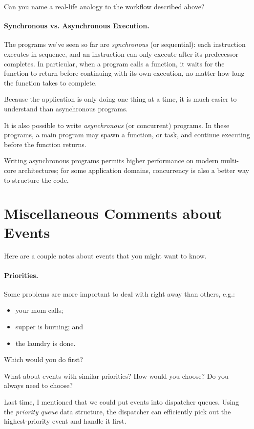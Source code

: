 {\sf Can you name a real-life analogy to the workflow described above?}
\\[1em]

\paragraph{Synchronous vs. Asynchronous Execution.} The programs we've
seen so far are \emph{synchronous} (or sequential): each instruction
executes in sequence, and an instruction can only execute after its
predecessor completes.
In particular, when a program calls a function, it waits for the function
to return before continuing with its own execution, no matter how long
the function takes to complete.

Because the application is only doing one thing at a time, it is much
easier to understand than asynchronous programs.

It is also possible to write \emph{asynchronous} (or concurrent)
programs. In these programs, a main program may spawn a function, or
task, and continue executing before the function returns.

Writing asynchronous programs permits higher performance on modern
multi-core architectures; for some application domains, concurrency is
also a better way to structure the code.

\section*{Miscellaneous Comments about Events}
Here are a couple notes about events that you might want to know.

\paragraph{Priorities.} Some problems are more important to deal
with right away than others, e.g.:
\begin{itemize}
\item your mom calls; 
\item supper is burning; and
\item the laundry is done.
\end{itemize}
Which would you do first?

What about events with similar priorities? How would you choose?
Do you always need to choose?

Last time, I mentioned that we could put events into dispatcher queues.
Using the \emph{priority queue} data structure, the dispatcher
can efficiently pick out the highest-priority event and handle it first.

